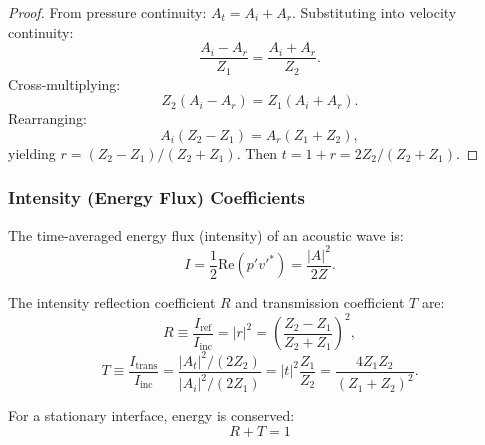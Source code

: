 \begin{proof}
From pressure continuity: $A_t = A_i + A_r$. Substituting into velocity continuity:
\begin{equation}
\frac{A_i - A_r}{Z_1} = \frac{A_i + A_r}{Z_2}.
\end{equation}
Cross-multiplying:
\begin{equation}
Z_2 (A_i - A_r) = Z_1 (A_i + A_r).
\end{equation}
Rearranging:
\begin{equation}
A_i (Z_2 - Z_1) = A_r (Z_1 + Z_2),
\end{equation}
yielding $r = (Z_2 - Z_1)/(Z_2 + Z_1)$. Then $t = 1 + r = 2Z_2/(Z_2 + Z_1)$.
\end{proof}

\subsubsection{Intensity (Energy Flux) Coefficients}

\begin{definition}
The time-averaged energy flux (intensity) of an acoustic wave is:
\begin{equation}
\label{eq:intensity}
I = \frac{1}{2} \text{Re}(p' v'^*) = \frac{|A|^2}{2 Z}.
\end{equation}
\end{definition}

\begin{proposition}
\label{prop:intensity_coefficients}
The intensity reflection coefficient $R$ and transmission coefficient $T$ are:
\begin{equation}
\label{eq:R_T_def}
R \equiv \frac{I_{\text{ref}}}{I_{\text{inc}}} = |r|^2 = \left( \frac{Z_2 - Z_1}{Z_2 + Z_1} \right)^2,
\end{equation}
\begin{equation}
\label{eq:T_def}
T \equiv \frac{I_{\text{trans}}}{I_{\text{inc}}} = \frac{|A_t|^2 / (2 Z_2)}{|A_i|^2 / (2 Z_1)} = |t|^2 \frac{Z_1}{Z_2} = \frac{4 Z_1 Z_2}{(Z_1 + Z_2)^2}.
\end{equation}
\end{proposition}

\begin{proposition}
\label{prop:R_plus_T}
For a stationary interface, energy is conserved:
\begin{equation}
\label{eq:R_plus_T_1}
\boxed{R + T = 1}
\end{equation}
\end{proposition}

